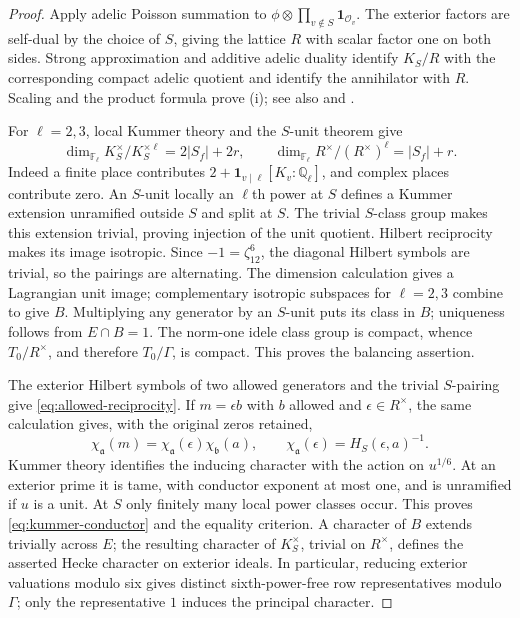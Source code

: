 \documentclass[11pt,a4paper]{article}
\numberwithin{equation}{section}
\theoremstyle{definition}
\theoremstyle{remark}
\begin{document}
\begin{proof}
Apply adelic Poisson summation to
$\phi\otimes\prod_{v\notin S}\mathbf1_{\mathcal O_v}$.
The exterior factors are self-dual by the choice of $S$, giving the
lattice $R$ with scalar factor one on both sides.  Strong approximation and
additive adelic duality identify $K_S/R$ with the corresponding compact
adelic quotient and identify the annihilator with $R$.  Scaling and the
product formula prove (i); see also \cite[Lemma~3.1]{P} and \cite{Tate}.

For $\ell=2,3$, local Kummer theory and the $S$-unit theorem give
\[
 \dim_{\mathbb F_\ell}K_S^\times/K_S^{\times\ell}=2|S_f|+2r,
 \qquad
 \dim_{\mathbb F_\ell}R^\times/(R^\times)^\ell=|S_f|+r.
\]
Indeed a finite place contributes
$2+\mathbf1_{v\mid\ell}[K_v:\mathbb Q_\ell]$, and complex places
contribute zero.  An $S$-unit locally an $\ell$th power at $S$ defines a
Kummer extension unramified outside $S$ and split at $S$.  The trivial
$S$-class group makes this extension trivial, proving injection of the
unit quotient.  Hilbert reciprocity makes its image isotropic.
Since $-1=\zeta_{12}^6$, the diagonal Hilbert symbols are trivial, so the
pairings are alternating.  The dimension calculation gives a Lagrangian
unit image; complementary isotropic subspaces for $\ell=2,3$ combine to
give $B$.  Multiplying any generator by an $S$-unit puts its class in $B$;
uniqueness follows from $E\cap B=1$.  The norm-one idele class group is
compact, whence $T_0/R^\times$, and therefore $T_0/\Gamma$, is compact.
This proves the balancing assertion.

The exterior Hilbert symbols of two allowed generators and the trivial
$S$-pairing give \eqref{eq:allowed-reciprocity}.  If
$m=\epsilon b$ with $b$ allowed and $\epsilon\in R^\times$, the same
calculation gives, with the original zeros retained,
\begin{equation}\label{eq:unit-reciprocity}
 \chi_{\mathfrak a}(m)=\chi_{\mathfrak a}(\epsilon)
                         \chi_{\mathfrak b}(a),\qquad
 \chi_{\mathfrak a}(\epsilon)=H_S(\epsilon,a)^{-1}.
\end{equation}
Kummer theory identifies the inducing character with the action on
$u^{1/6}$.  At an exterior prime it is tame, with conductor exponent at
most one, and is unramified if $u$ is a unit.  At $S$ only finitely many
local power classes occur.  This proves \eqref{eq:kummer-conductor} and
the equality criterion.  A character of $B$ extends trivially across
$E$; the resulting character of $K_S^\times$, trivial on $R^\times$,
defines the asserted Hecke character on exterior ideals.  In particular,
reducing exterior valuations modulo six gives distinct sixth-power-free
row representatives modulo $\Gamma$; only the representative $1$
induces the principal character.


\end{proof}
\end{document}
